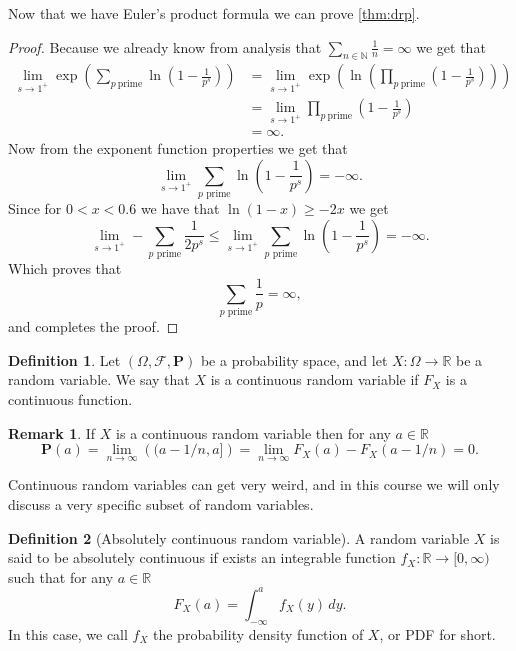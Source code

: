 \documentclass[11pt,a4paper]{article}
\theoremstyle{definition}
\newtheorem{definition}{Definition}[section]
\newtheorem{remark}{Remark}[section]
\theoremstyle{plain}
\newcommand{\N}{\mathbb{N}}
\newcommand{\R}{\mathbb{R}}
\begin{document}
  Now that we have Euler's product formula we can prove \autoref{thm:drp}.
  \begin{proof}
    Because we already know from analysis that 
    $\sum_{n \in \N} \frac 1n = \infty$ we get that
    \begin{align*}
      \lim_{s \to 1^+}
      \exp\left(\sum_{p \ \mathrm{prime}}
      \ln \left(1 - \frac{1}{p^{s}}\right)\right) &=
      \lim_{s \to 1^+}
      \exp \left(\ln\left(\prod_{p \ \mathrm{prime}}
      \left(1 - \frac{1}{p^{s}}\right)\right)\right) \\ &= 
      \lim_{s \to 1^+} 
      \prod_{p \ \mathrm{prime}} \left(1 - \frac{1}{p^{s}}\right) \\ &= 
      \infty.
    \end{align*}
    Now from the exponent function properties we get that
    \[
      \lim_{s \to 1^+} 
      \sum_{p \text{ prime}} \ln\left(1 - \frac{1}{p^{s}}\right) =
      - \infty.
    \]
    Since for $0 < x < 0.6$ we have that $\ln(1-x) \geq -2x$ we get
    \[
      \lim_{s \to 1^+}
      - \sum_{p \text{ prime}} \frac{1}{2 p^s} \le
      \lim_{s \to 1^+}
      \sum_{p \text{ prime}} \ln\left(1 - \frac{1}{p^{s}}\right) =
      - \infty.
    \]
    Which proves that
    \[
      \sum_{p \text{ prime}} \frac{1}{p} = \infty,
    \]
    and completes the proof.
  \end{proof}

  \begin{definition}
    Let $(\Omega, \mathcal F, \mathbf P)$ be a probability space,
    and let $X \colon \Omega \to \R$ be a random variable.
    We say that $X$ is a continuous random variable if $F_X$ is a
    continuous function.
  \end{definition}
  \begin{remark}
    If $X$ is a continuous random variable then for any $a \in \R$
    \[
      \mathbf P(a) = 
      \lim_{n \to \infty}\left((a - 1/n, a]\right) =
      \lim_{n \to \infty} F_X(a) - F_X(a - 1/n) =
      0.
    \]
  \end{remark}
  
  Continuous random variables can get very weird, and in this course we
  will only discuss a very specific subset of random variables.

  \begin{definition}[Absolutely continuous random variable]
    A random variable $X$ is said to be absolutely continuous if exists an
    integrable function $f_X \colon \R \to [0,\infty)$ such that for any
    $a \in \R$
    \[
      F_X(a) = \int_{-\infty}^{a} f_X(y)\,dy.
    \]
    In this case, we call $f_X$ the probability density function of $X$,
    or PDF for short.
  \end{definition}
  
\end{document}
